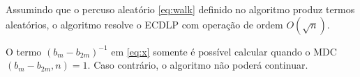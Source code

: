 Assumindo que o percuso aleatório \ref{eq:walk} definido no algoritmo produz termos aleatórios, o algoritmo resolve o ECDLP com operação de ordem $O(\sqrt{n})$. \cite{Pollard:1978}

O termo $(b_m - b_{2m})^{-1}$ em \ref{eq:x} somente é possível calcular quando o MDC$(b_m - b_{2m}, n) = 1$. Caso contrário, o algoritmo não poderá continuar.
